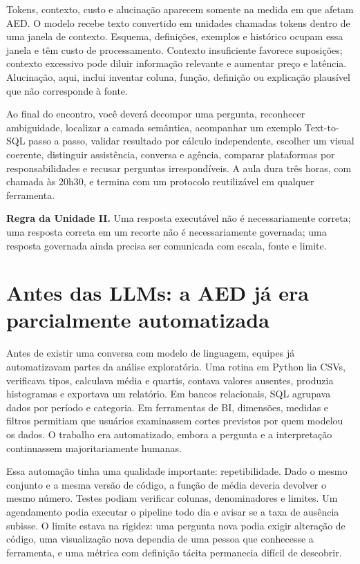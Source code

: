 Tokens, contexto, custo e alucinação aparecem somente na medida em que afetam AED. O modelo recebe texto convertido em unidades chamadas tokens dentro de uma janela de contexto. Esquema, definições, exemplos e histórico ocupam essa janela e têm custo de processamento. Contexto insuficiente favorece suposições; contexto excessivo pode diluir informação relevante e aumentar preço e latência. Alucinação, aqui, inclui inventar coluna, função, definição ou explicação plausível que não corresponde à fonte.

Ao final do encontro, você deverá decompor uma pergunta, reconhecer ambiguidade, localizar a camada semântica, acompanhar um exemplo Text-to-SQL passo a passo, validar resultado por cálculo independente, escolher um visual coerente, distinguir assistência, conversa e agência, comparar plataformas por responsabilidades e recusar perguntas irrespondíveis. A aula dura três horas, com chamada às 20h30, e termina com um protocolo reutilizável em qualquer ferramenta.

\begin{SummaryBox}
\textbf{Regra da Unidade II.} Uma resposta executável não é necessariamente correta; uma resposta correta em um recorte não é necessariamente governada; uma resposta governada ainda precisa ser comunicada com escala, fonte e limite.
\end{SummaryBox}

\section{Antes das LLMs: a AED já era parcialmente automatizada}

Antes de existir uma conversa com modelo de linguagem, equipes já automatizavam partes da análise exploratória. Uma rotina em Python lia CSVs, verificava tipos, calculava média e quartis, contava valores ausentes, produzia histogramas e exportava um relatório. Em bancos relacionais, SQL agrupava dados por período e categoria. Em ferramentas de BI, dimensões, medidas e filtros permitiam que usuários examinassem cortes previstos por quem modelou os dados. O trabalho era automatizado, embora a pergunta e a interpretação continuassem majoritariamente humanas.

Essa automação tinha uma qualidade importante: repetibilidade. Dado o mesmo conjunto e a mesma versão de código, a função de média deveria devolver o mesmo número. Testes podiam verificar colunas, denominadores e limites. Um agendamento podia executar o pipeline todo dia e avisar se a taxa de ausência subisse. O limite estava na rigidez: uma pergunta nova podia exigir alteração de código, uma visualização nova dependia de uma pessoa que conhecesse a ferramenta, e uma métrica com definição tácita permanecia difícil de descobrir.

